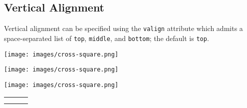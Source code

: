 \documentclass[10pt,]{article}
\theoremstyle{plain}
\theoremstyle{definition}
\theoremstyle{definition}
\theoremstyle{definition}
\theoremstyle{definition}
\theoremstyle{definition}
\theoremstyle{definition}
\numberwithin{equation}{section}
\newlength{\panelmax}
\begin{document}
\subsection[{Vertical Alignment}]{Vertical Alignment}\label{subsection-40}
\hypertarget{p-663}{}%
Vertical alignment can be specified using the \lstinline?valign? attribute which admits a space-separated list of \lstinline?top?, \lstinline?middle?, and \lstinline?bottom?; the default is \lstinline?top?.%
{%
\setlength{\panelmax}{0pt}
\ifdefined\panelboxAimage\else\newsavebox{\panelboxAimage}\fi%
\begin{lrbox}{\panelboxAimage}
\texttt{[image: images/cross-square.png]}
\end{lrbox}
\ifdefined\phAimage\else\newlength{\phAimage}\fi%
\setlength{\phAimage}{\ht\panelboxAimage+\dp\panelboxAimage}
\settototalheight{\phAimage}{\usebox{\panelboxAimage}}
\setlength{\panelmax}{\maxof{\panelmax}{\phAimage}}
\ifdefined\panelboxBimage\else\newsavebox{\panelboxBimage}\fi%
\begin{lrbox}{\panelboxBimage}
\texttt{[image: images/cross-square.png]}
\end{lrbox}
\ifdefined\phBimage\else\newlength{\phBimage}\fi%
\setlength{\phBimage}{\ht\panelboxBimage+\dp\panelboxBimage}
\settototalheight{\phBimage}{\usebox{\panelboxBimage}}
\setlength{\panelmax}{\maxof{\panelmax}{\phBimage}}
\ifdefined\panelboxCimage\else\newsavebox{\panelboxCimage}\fi%
\begin{lrbox}{\panelboxCimage}
\texttt{[image: images/cross-square.png]}
\end{lrbox}
\ifdefined\phCimage\else\newlength{\phCimage}\fi%
\setlength{\phCimage}{\ht\panelboxCimage+\dp\panelboxCimage}
\settototalheight{\phCimage}{\usebox{\panelboxCimage}}
\setlength{\panelmax}{\maxof{\panelmax}{\phCimage}}
\leavevmode%
\setlength{\tabcolsep}{0\linewidth}
\par\medskip\noindent
\begin{tabular}{@{}*{3}{c}@{}}
\begin{minipage}[c][\panelmax][c]{0.33\linewidth}\usebox{\panelboxAimage}\end{minipage}&
\begin{minipage}[c][\panelmax][t]{0.17\linewidth}\usebox{\panelboxBimage}\end{minipage}&
\begin{minipage}[c][\panelmax][c]{0.5\linewidth}\usebox{\panelboxCimage}\end{minipage}\tabularnewline
\parbox[t]{0.33\linewidth}{
}&
\parbox[t]{0.17\linewidth}{
}&
\parbox[t]{0.5\linewidth}{
}\end{tabular}\\
}%
\end{document}
